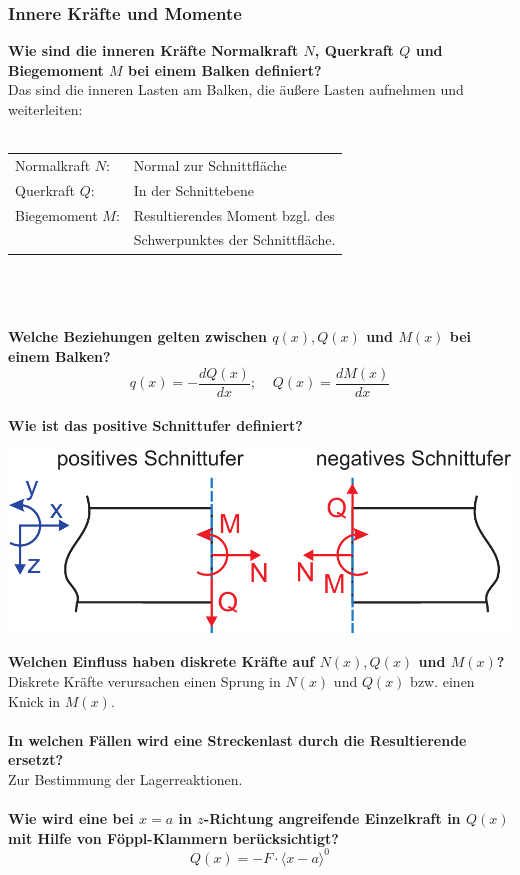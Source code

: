\documentclass[a4paper,twocolumn,10pt]{article}
\begin{document}
\subsubsection{Innere Kräfte und Momente}
\textbf{Wie sind die inneren Kräfte Normalkraft $N$, Querkraft $Q$ und Biegemoment $M$ bei einem Balken definiert?}\\
Das sind die inneren Lasten am Balken, die äußere Lasten aufnehmen und weiterleiten:\\\\
\begin{tabular}{ll}
Normalkraft $N$: & Normal zur Schnittfläche\\
Querkraft $Q$: & In der Schnittebene\\
Biegemoment $M$: & Resultierendes Moment bzgl. des\\
& Schwerpunktes der Schnittfläche.
\end{tabular}\\\\\\
\textbf{Welche Beziehungen gelten zwischen $q(x),Q(x)$ und $M(x)$ bei einem Balken?}\\
\begin{equation*}
q(x)=-\frac{dQ(x)}{dx};\;\;\;\;Q(x)=\frac{dM(x)}{dx}
\end{equation*}\\
\textbf{Wie ist das positive Schnittufer definiert?}\\
\begin{center}
\includegraphics[width=0.65\columnwidth]{Grafiken/Schnittufer}
\end{center}
\textbf{Welchen Einfluss haben diskrete Kräfte auf $N(x),Q(x)$ und $M(x)$?}\\
Diskrete Kräfte verursachen einen Sprung in $N(x)$ und $Q(x)$ bzw. einen Knick in $M(x)$.\\\\
\textbf{In welchen Fällen wird eine Streckenlast durch die Resultierende ersetzt?}\\
Zur Bestimmung der Lagerreaktionen.\\\\
\textbf{Wie wird eine bei $x=a$ in $z$-Richtung angreifende Einzelkraft in $Q(x)$ mit Hilfe von Föppl-Klammern berücksichtigt?}\\
\begin{equation*}
Q(x)=-F\cdot\langle x-a\rangle^0
\end{equation*}
\end{document}
